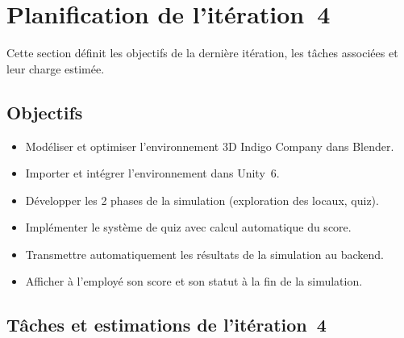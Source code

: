 \section{Planification de l'itération~4}

Cette section définit les objectifs de la dernière itération, les tâches associées et
leur charge estimée.

\subsection{Objectifs}

\begin{itemize}
  \item Modéliser et optimiser l'environnement 3D Indigo Company dans Blender.
  \item Importer et intégrer l'environnement dans Unity~6.
  \item Développer les 2 phases de la simulation (exploration des locaux, quiz).
  \item Implémenter le système de quiz avec calcul automatique du score.
  \item Transmettre automatiquement les résultats de la simulation au backend.
  \item Afficher à l'employé son score et son statut à la fin de la simulation.
\end{itemize}

\subsection{Tâches et estimations de l'itération~4}

